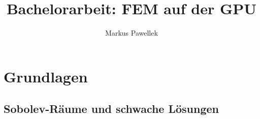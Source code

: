 \documentclass[10pt,fleqn,a4paper]{article}
\title{Bachelorarbeit: FEM auf der GPU}
\author{Markus Pawellek}
\begin{document}
  \maketitle

  \section{Grundlagen} %
  \label{sec:grundlagen}

    \subsection{Sobolev-Räume und schwache Lösungen} %
    \label{sub:sobolev_raeume_und_schwache_loesungen}


\end{document}
